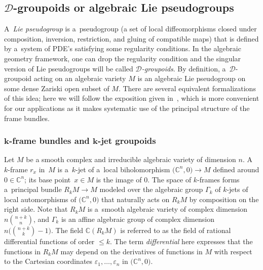 \documentclass[pdftex]{sigma}
\numberwithin{equation}{section}
\theoremstyle{definition}
\begin{document}
\subsection[D-groupoids or algebraic Lie pseudogroups]{$\boldsymbol{\mathcal{D}}$-groupoids or algebraic Lie pseudogroups}

 A~\textit{Lie pseudogroup} is a~pseudogroup (a set of local diffeomorphisms closed under composition, inversion, restriction, and gluing of compatible maps) that is defined by a~system of PDE's satisfying some regularity conditions. In the algebraic geometry framework, one can drop the regularity condition and the singular version of Lie pseudogroups will be called \textit{$ \mathcal D$-groupoids}. By definition, a~$\mathcal D$-groupoid acting on an algebraic variety $M$ is an algebraic Lie pseudogroup on some dense Zariski open subset of $M$. There are several equivalent formalizations of this idea; here we will follow the exposition given in~\cite[Section 2]{bcd2022malgrange}, which is more convenient for our applications as it makes systematic use of the principal structure of the frame bundles.

\subsubsection[k-frame bundles and k-jet groupoids]{$\boldsymbol{k}$-frame bundles and $\boldsymbol{k}$-jet groupoids}
Let $M$ be a smooth complex and irreducible algebraic variety of dimension $n$. A~$k$-frame $r_x$ in~$M$ is a~$k$-jet of a~local biholomorphism $\bigl(\mathbb C^n,0\bigr)\to M$ defined around $0\in \mathbb C^n$; its base point~${x\in M}$ is the image of $0$. The space of $k$-frames forms a~principal bundle $R_kM\to M$ modeled over the algebraic group $\Gamma_k$ of $k$-jets of local automorphisms of $\bigl(\mathbb C^n,0\bigr)$ that naturally acts on $R_kM$ by composition on the right side. Note that $R_kM$ is a~smooth algebraic variety of complex dimension $n\binom{n+k}{n}$, and $\Gamma_k$ is an affine algebraic group of complex dimension $n\big(\binom{n+k}{k} -1 \big)$. The field \(\mathbb{C}(R_k M)\) is referred to as the field of rational differential functions of order $\leq k$. The term \emph{differential} here expresses that the functions in $R_kM$ may depend on the derivatives of functions in $M$ with respect to the Cartesian coordinates $\varepsilon_1, \dots, \varepsilon_n$ in $\bigl(\mathbb C^n,0\bigr)$.
\end{document}
